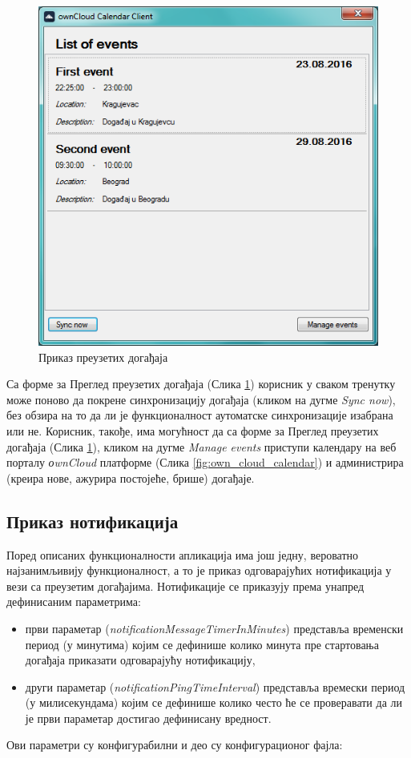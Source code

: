 \begin{figure}[H]
	\centering
	\includegraphics[scale=0.5]{slike/EventsList}
	\caption{Приказ преузетих догађаја}
	\label{fig:events_list}
\end{figure}

Са форме за Преглед преузетих догађаја (Слика \ref{fig:events_list}) корисник у сваком тренутку може поново да покрене синхронизацију догађаја (кликом на дугме \textit{Sync now}), без обзира на то да ли је функционалност аутоматске синхронизације изабрана или не. Корисник, такође, има могућност да са форме за Преглед преузетих догађаја  (Слика \ref{fig:events_list}), кликом на дугме \textit{Manage events} приступи календару на веб порталу \textit{оwnCloud} платформе (Слика \ref{fig:own_cloud_calendar})  и администрира (креира нове, ажурира постојеће, брише) догађаје.

\subsection{Приказ нотификација}

Поред описаних функционалности апликација има још једну, вероватно најзанимљивију функционалност, а то је приказ одговарајућих нотификација у вези са преузетим догађајима. Нотификације се приказују према унапред дефинисаним параметрима:
\begin{itemize}
	\item{први параметар (\textit{notificationMessageTimerInMinutes}) представља временски период (у минутима) којим се дефинише колико минута пре стартовања догађаја приказати одговарајућу нотификацију},
	\item{други параметар (\textit{notificationPingTimeInterval}) представља времески период (у милисекундама) којим се дефинише колико често ће се проверавати да ли је први параметар достигао дефинисану вредност}.	

\end{itemize}
Ови параметри су конфигурабилни и део су конфигурационог фајла:

